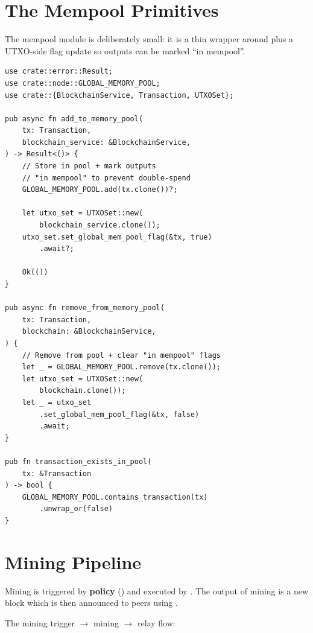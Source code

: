\section{The Mempool Primitives}
\label{sec:ch13-mempool}

The mempool module is deliberately small: it is a thin wrapper around  plus a UTXO-side flag update so outputs can be marked ``in mempool''.

\begin{listing}[htbp]
\caption{Mempool helpers}
\label{lst:ch13-mempool}
\begin{verbatim}
use crate::error::Result;
use crate::node::GLOBAL_MEMORY_POOL;
use crate::{BlockchainService, Transaction, UTXOSet};

pub async fn add_to_memory_pool(
    tx: Transaction,
    blockchain_service: &BlockchainService,
) -> Result<()> {
    // Store in pool + mark outputs
    // "in mempool" to prevent double-spend
    GLOBAL_MEMORY_POOL.add(tx.clone())?;

    let utxo_set = UTXOSet::new(
        blockchain_service.clone());
    utxo_set.set_global_mem_pool_flag(&tx, true)
        .await?;

    Ok(())
}

pub async fn remove_from_memory_pool(
    tx: Transaction,
    blockchain: &BlockchainService,
) {
    // Remove from pool + clear "in mempool" flags
    let _ = GLOBAL_MEMORY_POOL.remove(tx.clone());
    let utxo_set = UTXOSet::new(
        blockchain.clone());
    let _ = utxo_set
        .set_global_mem_pool_flag(&tx, false)
        .await;
}

pub fn transaction_exists_in_pool(
    tx: &Transaction
) -> bool {
    GLOBAL_MEMORY_POOL.contains_transaction(tx)
        .unwrap_or(false)
}
\end{verbatim}
\end{listing}

\section{Mining Pipeline}
\label{sec:ch13-mining}

Mining is triggered by \textbf{policy} () and executed by . The output of mining is a new block which is then announced to peers using .

The mining trigger $\to$ mining $\to$ relay flow:


